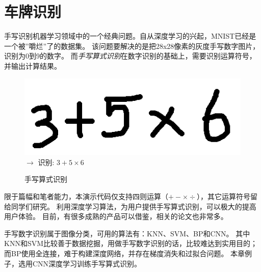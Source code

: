 \chapter{车牌识别}
\label{chap:java_ex_recongnition}


手写识别机器学习领域中的一个经典问题。自从深度学习的兴起，MNIST已经是一个被”嚼烂”了的数据集。
该问题要解决的是把28x28像素的灰度手写数字图片，识别为0到9的数字。
而\emph{手写算式识别}在数字识别的基础上，需要识别运算符号，并输出计算结果。

\begin{figure}[!htb]
\centerline{\includegraphics[width=.1\figwidth]{images/handwriting_math.png} $\to$ 识别: $3+5 \times 6$} 
\label{fig:part4_handwriting_math}
\caption{手写算式识别}
\end{figure}

限于篇幅和笔者能力，本演示代码仅支持四则运算（$+ - \times \div$），其它运算符号留给同学们研究。
利用深度学习算法，为用户提供手写算式识别，可以极大的提高用户体验。
目前，有很多成熟的产品可以借鉴，相关的论文也非常多。

手写数字识别属于图像分类，可用的算法有：KNN、SVM、BP和CNN。
其中KNN和SVM比较善于数据挖掘，用做手写数字识别的话，比较难达到实用目的；
而BP使用全连接，难于构建深度网络，并存在梯度消失和过拟合问题。
本章例子，选用CNN深度学习训练手写算式识别。

\begin{figure}[!htb] \centering 
{}
\end{figure}

